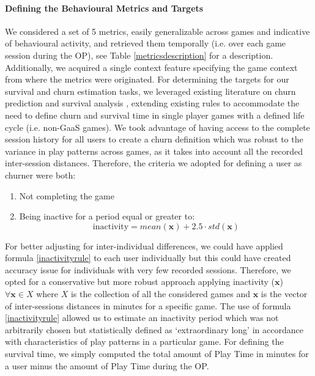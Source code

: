 \paragraph*{Defining the Behavioural Metrics and Targets}
We considered a set of 5 metrics, easily generalizable across games and indicative of behavioural activity, and retrieved them temporally  (i.e. over each game session during the OP), see Table \ref{metricsdescription} for a description. Additionally, we acquired a single context feature specifying the game context from where the metrics were originated. For determining the targets for our survival and churn estimation tasks, we leveraged existing literature on churn prediction \cite{drachen2016rapid, milovsevic2017early, lee2018game, perianez2016churn, runge2014churn, kim2017churn, hadiji2014predicting, xie2015predicting} and survival analysis \cite{viljanen2018playtime, demediuk2018player, lee2018game, bertens2017games}, extending existing rules to accommodate the need to define churn and survival time in single player games with a defined life cycle (i.e. non-GaaS games). We took advantage of having access to the complete session history for all users to create a churn definition which was robust to the variance in play patterns across games, as it takes into account all the recorded inter-session distances. Therefore, the criteria we adopted for defining a user as churner were both: 

\begin{enumerate}
    \item Not completing the game
    \item Being inactive for a period equal or greater to:
        \begin{equation}
            \label{inactivityrule}
            \text{inactivity} = 
            mean(\mathbf{x}) + 2.5 \cdot std(\mathbf{x})
        \end{equation}
\end{enumerate}

For better adjusting for inter-individual differences, we could have applied formula \ref{inactivityrule} to each user individually but this could have created accuracy issue for individuals with very few recorded sessions. Therefore, we opted for a conservative but more robust approach applying inactivity ($\mathbf{x}$) $\forall \mathbf{x} \in X$ where $X$ is the collection of all the considered games and $\mathbf{x}$ is the vector of inter-sessions distances in minutes for a specific game. The use of formula \ref{inactivityrule} allowed us to estimate an inactivity period which was not arbitrarily chosen but statistically defined as ‘extraordinary long’ in accordance with characteristics of play patterns in a particular game. For defining the survival time, we simply computed the total amount of Play Time in minutes for a user minus the amount of Play Time during the OP.


